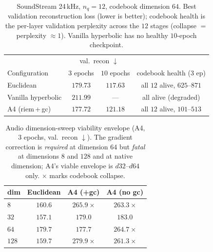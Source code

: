 \documentclass[12pt]{report}
\begin{document}
\begin{table}[h]
\centering
\caption{SoundStream 24\,kHz, $n_q=12$, codebook dimension $64$. Best validation reconstruction loss (lower is better); codebook health is the per-layer validation perplexity across the $12$ stages (collapse $=$ perplexity $\approx 1$). Vanilla hyperbolic has no healthy $10$-epoch checkpoint.}
\label{tab:audio_d64}
\begin{tabular}{lccc}
\hline
& \multicolumn{2}{c}{val.\ recon $\downarrow$} & \\
Configuration & $3$ epochs & $10$ epochs & codebook health ($3$ ep) \\
\hline
Euclidean & $179.73$ & $\mathbf{117.63}$ & all $12$ alive, $625$--$871$ \\
Vanilla hyperbolic & $211.99$ & --- & all alive (degraded) \\
A4 (riem\,+\,gc) & $\mathbf{177.72}$ & $121.18$ & all $12$ alive, $101$--$513$ \\
\hline
\end{tabular}
\end{table}

\begin{table}[h]
\centering
\caption{Audio dimension-sweep viability envelope (A4, $3$ epochs, val.\ recon $\downarrow$). The gradient correction is \emph{required} at dimension $64$ but \emph{fatal} at dimensions $8$ and $128$ and at native dimension; A4's viable envelope is $d32$--$d64$ only. $\boldsymbol{\times}$ marks codebook collapse.}
\label{tab:audio_dim}
\begin{tabular}{lccc}
\hline
dim & Euclidean & A4 (+gc) & A4 (no gc) \\
\hline
$8$   & $160.6$ & $265.9\ \boldsymbol{\times}$ & $263.3\ \boldsymbol{\times}$ \\
$32$  & $157.1$ & $179.0$ & $183.0$ \\
$64$  & $179.7$ & $\mathbf{177.7}$ & $264.7\ \boldsymbol{\times}$ \\
$128$ & $159.7$ & $279.9\ \boldsymbol{\times}$ & $261.3\ \boldsymbol{\times}$ \\
\hline
\end{tabular}
\end{table}
\end{document}
